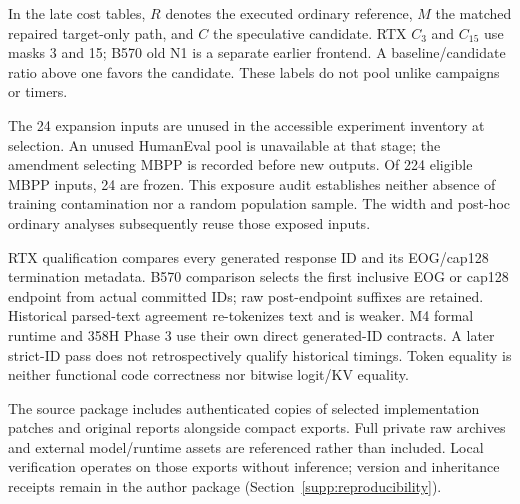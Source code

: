In the late cost tables, $R$ denotes the executed ordinary reference, $M$ the matched repaired target-only path, and $C$ the speculative candidate. RTX $C_3$ and $C_{15}$ use masks 3 and 15; B570 old N1 is a separate earlier frontend. A baseline/candidate ratio above one favors the candidate. These labels do not pool unlike campaigns or timers.

The 24 expansion inputs are unused in the accessible experiment inventory at selection. An unused HumanEval pool is unavailable at that stage; the amendment selecting MBPP is recorded before new outputs. Of 224 eligible MBPP inputs, 24 are frozen. This exposure audit establishes neither absence of training contamination nor a random population sample. The width and post-hoc ordinary analyses subsequently reuse those exposed inputs.

RTX qualification compares every generated response ID and its EOG/cap128 termination metadata. B570 comparison selects the first inclusive EOG or cap128 endpoint from actual committed IDs; raw post-endpoint suffixes are retained. Historical parsed-text agreement re-tokenizes text and is weaker. M4 formal runtime and 358H Phase 3 use their own direct generated-ID contracts. A later strict-ID pass does not retrospectively qualify historical timings. Token equality is neither functional code correctness nor bitwise logit/KV equality.

The source package includes authenticated copies of selected implementation patches and original reports alongside compact exports. Full private raw archives and external model/runtime assets are referenced rather than included. Local verification operates on those exports without inference; version and inheritance receipts remain in the author package (Section~\ref{supp:reproducibility}).
